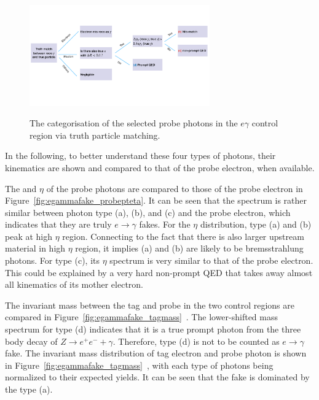 \begin{figure}[!htbp]
\centering
{\includegraphics[width=0.69\textwidth]{figures/egammafakes/efake_truth_matching.pdf}}
\caption [] {The categorisation of the selected probe photons in the $e\gamma$ control region via truth particle matching.}
\label{fig:egammafake_classes}
\end{figure}  

In the following, to better understand these four types of photons, their kinematics are shown and compared to that of the probe electron, when available.

The \pt and $\eta$ of the probe photons are compared to those of the probe electron in Figure~\ref{fig:egammafake_probepteta}. 
It can be seen that the \pt spectrum is rather similar between photon type (a), (b), and (c) and the probe electron, which indicates that they are truly $e\to\gamma$ fakes.
For the $\eta$ distribution, type (a) and (b) peak at high $\eta$ region. Connecting to the fact that there is also larger upstream material in high $\eta$ region, it implies (a) and (b) are likely to be bremsstrahlung photons.
For type (c), its $\eta$ spectrum is very similar to that of the probe electron. This could be explained by a very hard non-prompt QED that takes away almost all kinematics of its mother electron.

The invariant mass between the tag and probe in the two control regions are compared in Figure~\ref{fig:egammafake_tagmass}~. The lower-shifted mass spectrum for type (d) indicates that it is a true prompt photon from the three body decay of $Z\to e^+e^- +\gamma$. Therefore, type (d) is not to be counted as $e\rightarrow \gamma$ fake. The invariant mass distribution of tag electron and probe photon is shown in Figure~\ref{fig:egammafake_tagmass}~, with each type of photons being normalized to their expected yields. It can be seen that the fake is dominated by the type (a).


